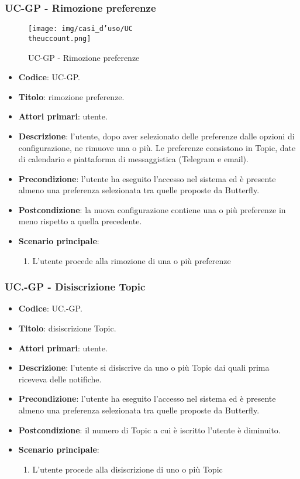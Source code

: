 \subsubsection{UC\theuccount-GP - Rimozione preferenze}
		\begin{figure}[H]
			\centering
				\texttt{[image: img/casi\_d'uso/UC\\theuccount.png]}\\
			\caption{UC\theuccount-GP - Rimozione preferenze}
		\end{figure}
	\begin{itemize}
		\item \textbf{Codice}: UC\theuccount-GP.
		\item \textbf{Titolo}: rimozione preferenze.
		\item \textbf{Attori primari}: utente.
		\item \textbf{Descrizione}: l’utente, dopo aver selezionato delle preferenze dalle opzioni di configurazione, ne rimuove una o più. Le preferenze consistono in Topic, date di calendario e piattaforma di messaggistica (Telegram e email).
		\item \textbf{Precondizione}: l’utente ha eseguito l'accesso nel sistema ed è presente almeno
        una preferenza selezionata tra quelle proposte da Butterfly.
		\item \textbf{Postcondizione}: la nuova configurazione contiene una o più preferenze in meno rispetto a quella precedente.
		\item \textbf{Scenario principale}:
		\begin{enumerate}
			\item L'utente procede alla rimozione di una o più preferenze
		\end{enumerate}
	\end{itemize}

	\subsubsection{UC\theuccount.\thesubuccount-GP - Disiscrizione Topic}

		\begin{itemize}
			\item \textbf{Codice}: UC\theuccount.\thesubuccount-GP.
			\item \textbf{Titolo}: disiscrizione Topic.
			\item \textbf{Attori primari}: utente.
			\item \textbf{Descrizione}: l’utente si disiscrive da uno o più Topic dai quali prima riceveva delle notifiche.
			\item \textbf{Precondizione}: l’utente ha eseguito l'accesso nel sistema ed è presente almeno
            una preferenza selezionata tra quelle proposte da Butterfly.
			\item \textbf{Postcondizione}: il numero di Topic a cui è iscritto l’utente è diminuito.
			\item \textbf{Scenario principale}:
			\begin{enumerate}
				\item L'utente procede alla disiscrizione di uno o più Topic
			\end{enumerate}
		\end{itemize}

